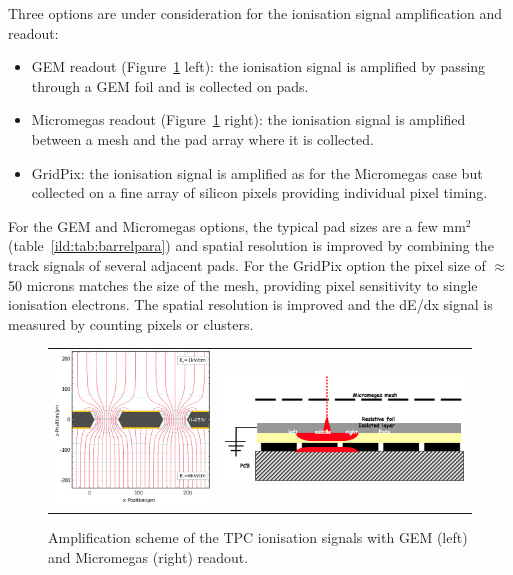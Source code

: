 Three options are under consideration for the ionisation signal amplification and readout:
\begin{itemize}
    \item GEM readout (Figure~\ref{fig:det:TPC_readout} left): the ionisation signal is amplified by passing through a GEM foil and is collected on pads.
    \item Micromegas readout (Figure~\ref{fig:det:TPC_readout} right): the ionisation signal is amplified between a mesh and the pad array where it is collected.
    \item GridPix: the ionisation signal is amplified as for the Micromegas case but collected on a fine array of silicon pixels providing individual pixel timing.
\end{itemize}
\vspace{0.5cm}
For the GEM and Micromegas options, the typical pad sizes are a few mm$^2$ (table~\ref{ild:tab:barrelpara}) and spatial resolution is improved by combining the track signals of several adjacent pads. For the GridPix option the pixel size of $\approx$50 microns matches the size of the mesh, providing pixel sensitivity to single ionisation electrons. The spatial resolution is improved and the dE/dx signal is measured by counting pixels or clusters. 

\begin{figure}[t!]
\begin{tabular}{cc}
\includegraphics[width=0.5\hsize,viewport={0 -10 600 500},clip]{Detector/fig/GEM.png} &
\includegraphics[width=0.5\hsize]{Detector/fig/micromegas.png}
\end{tabular}
\caption[TPC readout]{Amplification scheme of the TPC ionisation signals with GEM (left) and Micromegas (right) readout.}
\label{fig:det:TPC_readout}
\end{figure}

